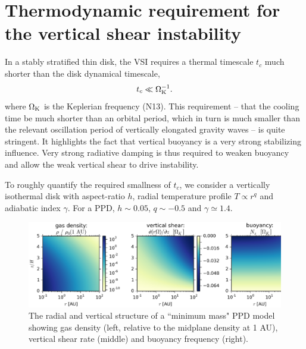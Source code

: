 \documentclass[iop]{emulateapj}
\def \OmK {\Omega_{\rm K}}
\begin{document}
\section{Thermodynamic requirement for the vertical shear instability}\label{vsi_require}     
In a stably stratified thin disk, the VSI  
requires a thermal timescale $t_c$ much shorter than the
disk dynamical timescale, 
\begin{align}
  t _c \ll \OmK^{-1}. 
\end{align}
where $\OmK$ is the Keplerian frequency (N13).    
This requirement -- that the cooling time be much shorter than an orbital period, 
which in turn is much smaller than the relevant oscillation period of vertically elongated gravity waves  -- is quite stringent.
It highlights the fact that vertical buoyancy is a very strong stabilizing influence.
Very strong radiative damping is thus required to weaken buoyancy and allow the weak vertical shear to drive instability.  

To roughly quantify the required smallness of $t_c$, we consider a
vertically isothermal disk with aspect-ratio $ h$, 
 radial temperature profile $T \propto r^q$ and adiabatic index
$\gamma$. For a PPD, $ h \sim 0.05$, $q\sim -0.5$ and $\gamma\simeq 1.4$. 

\begin{figure}
  \includegraphics[width=\linewidth]{figures/rhoshearNz}
  \caption{The radial and vertical structure of a ``minimum mass" PPD model showing gas density (left, relative to the midplane density at 1 AU), vertical shear rate (middle) and
    buoyancy frequency (right).
    \label{eqm_structure} 
  }
\end{figure}
\end{document}
